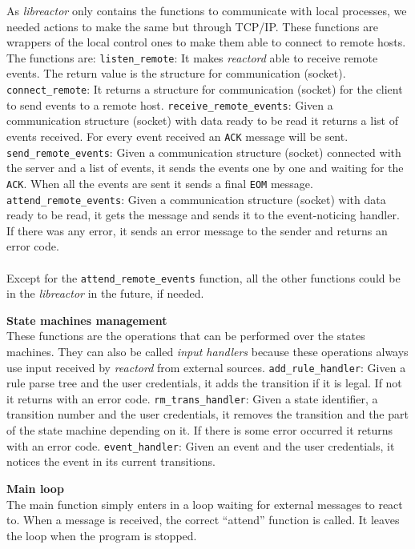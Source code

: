 \begin{list}{-}{The functionalities in this class are:}
    \subitem As \emph{libreactor} only contains the functions to communicate with local processes, we needed actions to make the same
      but through TCP/IP. These functions are wrappers of the local control ones to make them able to connect to remote hosts. The 
      functions are:
      \subitem \texttt{listen\_remote}:
	It makes \emph{reactord} able to receive remote events. The return value is the structure for communication (socket).
      \subitem \texttt{connect\_remote}:
	It returns a structure for communication (socket) for the client to send events to a remote host.
      \subitem \texttt{receive\_remote\_events}:
	Given a communication structure (socket) with data ready to be read it returns a list of events received. For every event received
	an \texttt{ACK} message will be sent.
      \subitem \texttt{send\_remote\_events}:
	Given a communication structure (socket) connected with the server and a list of events, it sends the events one by one and
	waiting for the \texttt{ACK}. When all the events are sent it sends a final \texttt{EOM} message.
      \subitem \texttt{attend\_remote\_events}:
	Given a communication structure (socket) with data ready to be read, it gets the message and sends it to the event-noticing 
	handler. If there was any error, it sends an error message to the sender and returns an error code.\\
      \\
      Except for the \texttt{attend\_remote\_events} function, all the other functions could be in the \emph{libreactor} in the future, if 
      needed.
  \item {\bf State machines management}\\
    These functions are the operations that can be performed over the states machines. They can also be called \emph{input handlers} 
    because these operations always use input received by \emph{reactord} from external sources.
      \subitem \texttt{add\_rule\_handler}:
	Given a rule parse tree and the user credentials, it adds the transition if it is legal. If not it returns with an error code.
      \subitem \texttt{rm\_trans\_handler}:
	Given a state identifier, a transition number and the user credentials, it removes the transition and the part of the state machine
	depending on it. If there is some error occurred it returns with an error code.
      \subitem \texttt{event\_handler}:
	Given an event and the user credentials, it notices the event in its current transitions.
  \item {\bf Main loop}\\
    The main function simply enters in a loop waiting for external messages to react to. When a message is received, the correct ``attend''
    function is called. It leaves the loop when the program is stopped.
\end{list}
